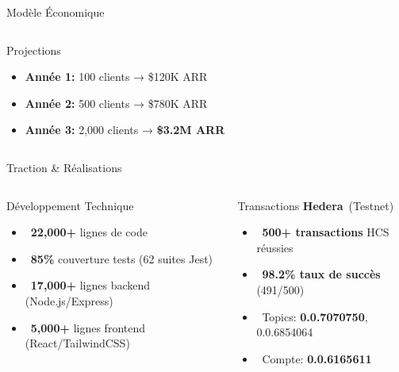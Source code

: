 \documentclass[aspectratio=169,11pt]{beamer}
\newcommand{\hedera}{\textbf{Hedera}\texttrademark}
\begin{document}
\begin{frame}{Modèle Économique}
\begin{columns}[T]
\begin{alertblock}{Projections}
\small
\begin{itemize}
    \item \textbf{Année 1:} 100 clients → \$120K ARR
    \item \textbf{Année 2:} 500 clients → \$780K ARR
    \item \textbf{Année 3:} 2,000 clients → \textbf{\$3.2M ARR}
\end{itemize}
\end{alertblock}
\end{columns}

\end{frame}

\begin{frame}{Traction \& Réalisations}

\begin{columns}[T]
\begin{block}{Développement Technique}
\begin{itemize}
    \item \faCode~\textbf{22,000+} lignes de code
    \item \faCheckCircle~\textbf{85\%} couverture tests (62 suites Jest)
    \item \faServer~\textbf{17,000+} lignes backend (Node.js/Express)
    \item \faReact~\textbf{5,000+} lignes frontend (React/TailwindCSS)
\end{itemize}
\end{block}

\vspace{0.3cm}

\begin{exampleblock}{Transactions \hedera~(Testnet)}
\begin{itemize}
    \item \faExchangeAlt~\textbf{500+ transactions} HCS réussies
    \item \faChartLine~\textbf{98.2\% taux de succès} (491/500)
    \item \faComments~Topics: \textbf{0.0.7070750}, 0.0.6854064
    \item \faUser~Compte: \textbf{0.0.6165611}
\end{itemize}
\end{exampleblock}


\end{columns}
\end{frame}
\end{document}
